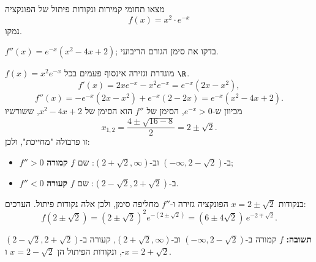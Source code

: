 
\begin{question}
מצאו תחומי קמירות ונקודות פיתול של הפונקציה
\[ f(x) = x^2 \cdot e^{-x} \]
נמקו.
\end{question}

\begin{hint}
$f''(x) = e^{-x}(x^2 - 4x + 2)$; בדקו את סימן הגורם הריבועי.
\end{hint}

\begin{solution}
$f(x) = x^2 e^{-x}$ מוגדרת וגזירה אינסוף פעמים בכל $\R$.
\[ f'(x) = 2xe^{-x} - x^2e^{-x} = e^{-x}(2x - x^2), \]
\[ f''(x) = -e^{-x}(2x - x^2) + e^{-x}(2 - 2x) = e^{-x}(x^2 - 4x + 2). \]
מכיוון ש-$e^{-x} > 0$, הסימן של $f''$ הוא הסימן של $x^2 - 4x + 2$, ששורשיו
\[ x_{1,2} = \frac{4 \pm \sqrt{16 - 8}}{2} = 2 \pm \sqrt2. \]
זו פרבולה "מחייכת", ולכן:
\begin{itemize}
  \item $f'' > 0$ ב-$(-\infty, 2 - \sqrt2)$ וב-$(2 + \sqrt2, \infty)$: שם $f$ \textbf{קמורה};
  \item $f'' < 0$ ב-$(2 - \sqrt2, 2 + \sqrt2)$: שם $f$ \textbf{קעורה}.
\end{itemize}
בנקודות $x = 2 \pm \sqrt2$ הפונקציה גזירה ו-$f''$ מחליפה סימן, ולכן אלה נקודות פיתול. הערכים:
\[ f(2 \pm \sqrt2) = (2 \pm \sqrt2)^2 e^{-(2 \pm \sqrt2)} = (6 \pm 4\sqrt2)\,e^{-2 \mp \sqrt2}. \]

\textbf{תשובה:} $f$ קמורה ב-$(-\infty, 2 - \sqrt2)$ וב-$(2 + \sqrt2, \infty)$, קעורה ב-$(2 - \sqrt2, 2 + \sqrt2)$, ונקודות הפיתול הן $x = 2 - \sqrt2$ ו-$x = 2 + \sqrt2$.
\end{solution}

